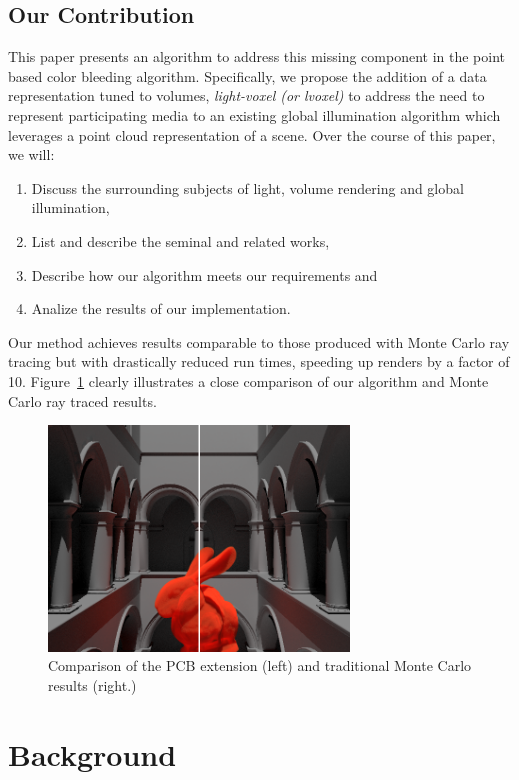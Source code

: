 \documentclass[12pt]{ucthesis}
\begin{document}
\section{Our Contribution}

This paper presents an algorithm to address this missing component in the point based color bleeding algorithm.  Specifically, we propose the addition of a data representation tuned to volumes,  \emph{light-voxel (or lvoxel)} to address the need to represent participating media to an existing global illumination algorithm which leverages a point cloud representation of a scene.  Over the course of this paper, we will:

\begin{enumerate}
\item Discuss the surrounding subjects of light, volume rendering and global illumination,
\item List and describe the seminal and related works,
\item Describe how our algorithm meets our requirements and
\item Analize the results of our implementation.
\end{enumerate}

Our method achieves results comparable to those produced with Monte Carlo ray tracing but with drastically reduced run times, speeding up renders by a factor of 10.  Figure~\ref{fig:compare} clearly illustrates a close comparison of our algorithm and Monte Carlo ray traced results.

\begin{figure}[h!]
    \centering
    \includegraphics[width=80mm]{img/compare.png}
    \caption{Comparison of the PCB extension (left) and traditional Monte Carlo results (right.)}
    \label{fig:compare}
\end{figure}

\chapter{Background}
\label{background}
\end{document}
